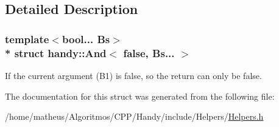 \subsection{Detailed Description}
\subsubsection*{template$<$bool... Bs$>$\\*
struct handy\+::\+And$<$ false, Bs... $>$}

If the current argument ({\ttfamily B1}) is {\ttfamily false}, so the return can only be {\ttfamily false}. 

The documentation for this struct was generated from the following file\+:\begin{DoxyCompactItemize}
\item 
/home/matheus/\+Algoritmos/\+C\+P\+P/\+Handy/include/\+Helpers/\hyperlink{Helpers_2Helpers_8h}{Helpers.\+h}\end{DoxyCompactItemize}
